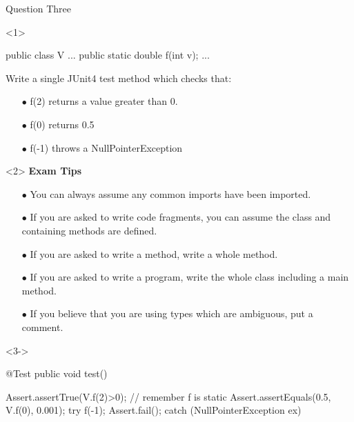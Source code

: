 \documentclass[12]{beamer}
\begin{document}
\begin{frame}[t, fragile]{Question Three} \vspace{4pt}

\begin{onlyenv}<1>
\begin{java}
public class V {
    ...
    public static double f(int v);
    ...
}
\end{java}

Write a single JUnit4 test method which checks that:
\begin{itemize}
\item[$\bullet$] f(2) returns a value greater than 0.
\item[$\bullet$] f(0) returns 0.5
\item[$\bullet$] f(-1) throws a NullPointerException
\end{itemize}
\end{onlyenv}

\begin{onlyenv}<2>
\textbf{Exam Tips}\\

\begin{itemize}

\item[$\bullet$] You can always assume any common imports have been imported.

\item[$\bullet$] If you are asked to write code fragments, you can assume the class and containing methods are defined.

\item[$\bullet$] If you are asked to write a method, write a whole method.

\item[$\bullet$] If you are asked to write a program, write the whole class including a main method.

\item[$\bullet$] If you believe that you are using types which are ambiguous, put a comment.

\end{itemize}
\end{onlyenv}

\begin{onlyenv}<3->
\begin{java}
@Test
public void test() {
    Assert.assertTrue(V.f(2)>0); // remember f is static
    Assert.assertEquals(0.5, V.f(0), 0.001);
    try {
        f(-1);
        Assert.fail();
    } catch (NullPointerException ex) {
        
}}
\end{java}
\end{onlyenv}
\end{frame}
\end{document}
